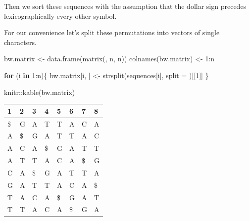 \documentclass[
]{book}
\newenvironment{Shaded}{\begin{snugshade}}{\end{snugshade}}
\newcommand{\AttributeTok}[1]{\textcolor[rgb]{0.77,0.63,0.00}{#1}}
\newcommand{\CommentTok}[1]{\textcolor[rgb]{0.56,0.35,0.01}{\textit{#1}}}
\newcommand{\ControlFlowTok}[1]{\textcolor[rgb]{0.13,0.29,0.53}{\textbf{#1}}}
\newcommand{\DecValTok}[1]{\textcolor[rgb]{0.00,0.00,0.81}{#1}}
\newcommand{\FunctionTok}[1]{\textcolor[rgb]{0.00,0.00,0.00}{#1}}
\newcommand{\NormalTok}[1]{#1}
\newcommand{\OtherTok}[1]{\textcolor[rgb]{0.56,0.35,0.01}{#1}}
\newcommand{\SpecialCharTok}[1]{\textcolor[rgb]{0.00,0.00,0.00}{#1}}
\newcommand{\StringTok}[1]{\textcolor[rgb]{0.31,0.60,0.02}{#1}}
\begin{document}
Then we sort these sequences with the assumption that the dollar sign precedes lexicographically every other symbol.

\begin{Shaded}
\end{Shaded}

For our convenience let's split these permutations into vectors of single characters.

\begin{Shaded}
\begin{Highlighting}[numbers=left,,]
\NormalTok{bw.matrix           }\OtherTok{\textless{}{-}} \FunctionTok{data.frame}\NormalTok{(}\FunctionTok{matrix}\NormalTok{(, n, n))}
\FunctionTok{colnames}\NormalTok{(bw.matrix) }\OtherTok{\textless{}{-}} \DecValTok{1}\SpecialCharTok{:}\NormalTok{n}

\ControlFlowTok{for}\NormalTok{ (i }\ControlFlowTok{in} \DecValTok{1}\SpecialCharTok{:}\NormalTok{n)\{}
\NormalTok{  bw.matrix[i, ] }\OtherTok{\textless{}{-}} \FunctionTok{strsplit}\NormalTok{(sequences[i], }\AttributeTok{split =} \StringTok{\textquotesingle{}\textquotesingle{}}\NormalTok{)[[}\DecValTok{1}\NormalTok{]]}
\NormalTok{\}}

\NormalTok{knitr}\SpecialCharTok{::}\FunctionTok{kable}\NormalTok{(bw.matrix)}
\end{Highlighting}
\end{Shaded}

\begin{tabular}{l|l|l|l|l|l|l|l}
\hline
1 & 2 & 3 & 4 & 5 & 6 & 7 & 8\\
\hline
\$ & G & A & T & T & A & C & A\\
\hline
A & \$ & G & A & T & T & A & C\\
\hline
A & C & A & \$ & G & A & T & T\\
\hline
A & T & T & A & C & A & \$ & G\\
\hline
C & A & \$ & G & A & T & T & A\\
\hline
G & A & T & T & A & C & A & \$\\
\hline
T & A & C & A & \$ & G & A & T\\
\hline
T & T & A & C & A & \$ & G & A\\
\hline
\end{tabular}
\end{document}
